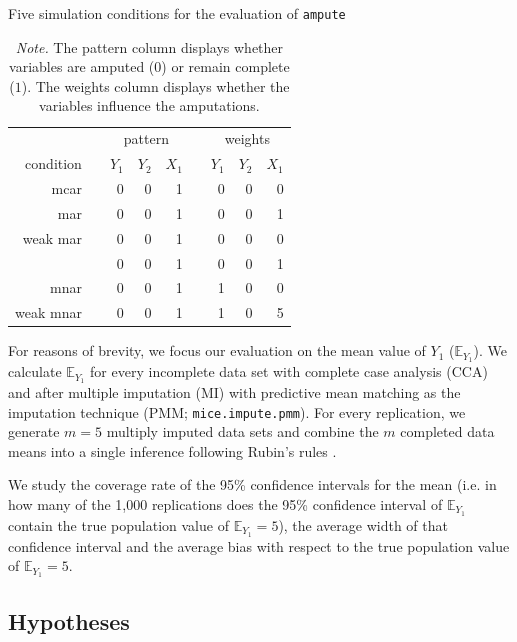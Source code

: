 \documentclass[11pt,a4paper]{article}
\newcommand{\code}[1]{\texttt{#1}}
\begin{document}
\begin{table}[b!]
\centering
\captionsetup{justification=justified,singlelinecheck=false,width = 0.50\textwidth}
\caption{\normalsize{Five simulation conditions for the evaluation of \code{ampute}}}
  \label{cond1}
\begin{tabular}{rrrrrrrrr}
  \hline
&& \multicolumn{3}{c}{pattern} && \multicolumn{3}{c}{weights} \\
\cline{3-5} \cline{7-9}
condition & & $Y_1$ & $Y_2$ & $X_1$ & & $Y_1$ & $Y_2$ & $X_1$ \\
\hline 
mcar & & 0 & 0 & 1 && 0 & 0 & 0 \\ [0.2cm]
mar & & 0 & 0 & 1 && 0 & 0 & 1 \\ [0.2cm]
weak mar & & 0 & 0 & 1 && 0 & 0 & 0 \\ 
 & & 0 & 0 & 1 && 0 & 0 & 1 \\[0.2 cm]
mnar & & 0 & 0 & 1 && 1 & 0 & 0 \\ [0.2cm]
weak mnar & & 0 & 0 & 1 && 1 & 0 & 5\\
   \hline
   \end{tabular}
   \vspace{2mm}
   \captionsetup{justification=justified,singlelinecheck=false,width = 0.50\textwidth}
\caption*{\footnotesize{\textit{Note.} The pattern column displays whether variables are amputed ($0$) or remain complete ($1$). The weights column displays whether the variables influence the amputations.}}
\end{table}

For reasons of brevity, we focus our evaluation on the mean value of $Y_1$ ($\mathbb{E}_{Y_1}$). We calculate $\mathbb{E}_{Y_1}$ for every incomplete data set with complete case analysis (CCA) and after multiple imputation (MI) with predictive mean matching as the imputation technique (PMM; \code{mice.impute.pmm}). For every replication, we generate $m = 5$ multiply imputed data sets and combine the $m$ completed data means into a single inference following Rubin's rules \citep[][pp. 76, 77]{Rubin1987}.

We study the coverage rate of the 95\% confidence intervals for the mean (i.e. in how many of the 1,000 replications does the 95\% confidence interval of $\mathbb{E}_{Y_1}$ contain the true population value of $\mathbb{E}_{Y_1} = 5$), the average width of that confidence interval and the average bias with respect to the true population value of $\mathbb{E}_{Y_1} = 5$. 

\subsection{\normalsize Hypotheses}\label{hypotheses}
\end{document}
